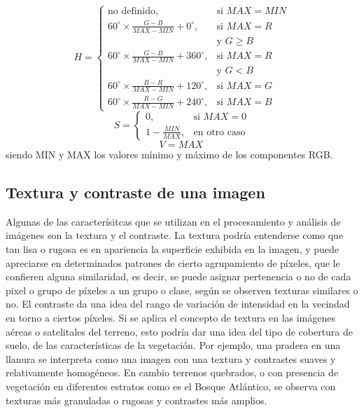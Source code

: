 \begin{equation}
    {\displaystyle H={\begin{cases}{\mbox{no definido}},&{\mbox{si }}MAX=MIN\\60^{\circ }\times {\frac {G-B}{MAX-MIN}}+0^{\circ },&{\mbox{si }}MAX=R\\&{\mbox{y }}G\geq B\\60^{\circ }\times {\frac {G-B}{MAX-MIN}}+360^{\circ },&{\mbox{si }}MAX=R\\&{\mbox{y }}G<B\\60^{\circ }\times {\frac {B-R}{MAX-MIN}}+120^{\circ },&{\mbox{si }}MAX=G\\60^{\circ }\times {\frac {R-G}{MAX-MIN}}+240^{\circ },&{\mbox{si }}MAX=B\end{cases}}}
\end{equation}
\begin{equation}
    {\displaystyle S={\begin{cases}0,&{\mbox{si }}MAX=0\\1-{\frac {MIN}{MAX}},&{\mbox{en otro caso}}\end{cases}}}
\end{equation}
\begin{equation}
    {\displaystyle V=MAX\,}
\end{equation}
siendo MIN y MAX los valores mínimo y máximo de los componentes RGB.
\subsection{Textura y contraste de una imagen}
Algunas de las caracterísitcas que se utilizan en el procesamiento y análisis de imágenes son la textura y el contraste. La textura podría entenderse como que tan lisa o rugosa es en apariencia la superficie exhibida en la imagen, y puede apreciarse en determinados patrones de cierto agrupamiento de píxeles, que le confieren alguna similaridad, es decir, se puede asignar pertenencia o no de cada pixel o grupo de píxeles a un grupo o clase, según se observen texturas similares o no. El contraste da una idea del rango de variación de intensidad en la vecindad en torno a ciertos píxeles. Si se aplica el concepto de textura en las imágenes aéreas o satelitales del terreno, esto podría dar una idea del tipo de cobertura de suelo, de las características de la vegetación. Por ejemplo, una pradera en una llanura se interpreta como una imagen con una textura y contrastes suaves y relativamente homogéneos. En cambio terrenos quebrados, o con presencia de vegetación en diferentes estratos como es el Bosque Atlántico, se observa con texturas más granuladas o rugosas y contrastes más amplios.
